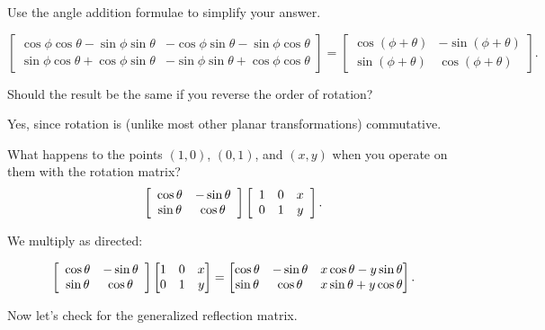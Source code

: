 \documentclass[../key.tex]{subfiles}
\begin{document}
\begin{inner_problem}
\item Use the angle addition formulae to simplify your answer.
\end{inner_problem}

$$\begin{bmatrix} \cos\phi\cos\theta - \sin\phi\sin\theta & -\cos\phi\sin\theta-\sin\phi\cos\theta \\ \sin\phi\cos\theta + \cos\phi\sin\theta & -\sin\phi\sin\theta+\cos\phi\cos\theta \end{bmatrix} = \begin{bmatrix} \cos(\phi+\theta) & -\sin(\phi + \theta) \\ \sin(\phi + \theta) & \cos(\phi + \theta)\end{bmatrix}.$$

\begin{inner_problem}
\item Should the result be the same if you reverse the order of rotation?
\end{inner_problem}

Yes, since rotation is (unlike most other planar transformations) commutative.

\begin{inner_problem}
\item What happens to the points $(1,0)$, $(0,1)$, and $(x,y)$ when you operate on them with the rotation matrix? $$\left[\begin{array}{cc} \cos \theta & -\sin \theta \\ \sin\theta & \cos\theta \end{array}\right]\left[\begin{array}{ccc} 1 & 0 & x \\ 0 & 1 & y \end{array}\right].$$
\end{inner_problem}

We multiply as directed:

$$\left[\begin{array}{cc} \cos \theta & -\sin \theta \\ \sin\theta & \cos\theta \end{array}\right]\begin{bmatrix} 1 & 0 & x \\ 0 & 1 & y \end{bmatrix} = \begin{bmatrix}\cos \theta & -\sin\theta & x\cos\theta - y\sin\theta \\ \sin\theta & \cos\theta & x\sin\theta + y\cos\theta \end{bmatrix}.$$

\begin{outer_problem}
\item Now let's check for the generalized reflection matrix.
\end{outer_problem}
\end{document}
